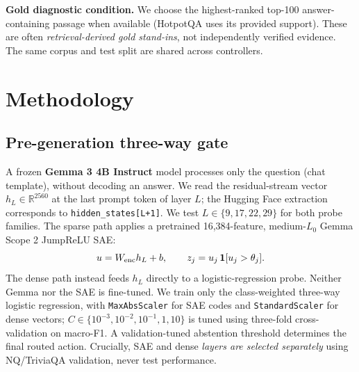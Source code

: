 \documentclass[11pt,a4paper,twocolumn]{article}
\begin{document}
\textbf{Gold diagnostic condition.} We choose the highest-ranked top-100 answer-containing passage when available (HotpotQA uses its provided support). These are often \emph{retrieval-derived gold stand-ins}, not independently verified evidence. The same corpus and test split are shared across controllers.

\section{Methodology}
\subsection{Pre-generation three-way gate}
A frozen \textbf{Gemma 3 4B Instruct} model \cite{gemma3} processes only the question (chat template), without decoding an answer. We read the residual-stream vector $h_L\in\mathbb{R}^{2560}$ at the last prompt token of layer $L$; the Hugging Face extraction corresponds to \texttt{hidden\_states[L+1]}. We test $L\in\{9,17,22,29\}$ for both probe families. The sparse path applies a pretrained 16,384-feature, medium-$L_0$ Gemma Scope 2 JumpReLU SAE:
\begin{equation}
 u=W_{\rm enc}h_L+b,\qquad z_j=u_j\,\mathbf{1}[u_j>\theta_j].\label{eq:sae}
\end{equation}
The dense path instead feeds $h_L$ directly to a logistic-regression probe. Neither Gemma nor the SAE is fine-tuned. We train only the class-weighted three-way logistic regression, with \texttt{MaxAbsScaler} for SAE codes and \texttt{StandardScaler} for dense vectors; $C\in\{10^{-3},10^{-2},10^{-1},1,10\}$ is tuned using three-fold cross-validation on macro-F1. A validation-tuned abstention threshold determines the final routed action. Crucially, SAE and dense \emph{layers are selected separately} using NQ/TriviaQA validation, never test performance.
\end{document}
